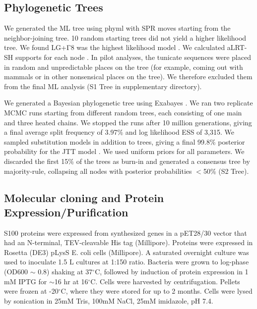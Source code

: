 \subsection{Phylogenetic Trees}

We generated the ML tree using phyml \cite{guindon_new_2010} with
SPR moves starting from the neighbor-joining tree. 10 random starting
trees did not yield a higher likelihood tree. We found LG+Γ8 was
the highest likelihood model \cite{le_improved_2008}. We calculated
aLRT-SH supports for each node \cite{anisimova_survey_2011}. In pilot
analyses, the tunicate sequences were placed in random and unpredictable
places on the tree (for example, coming out with mammals or in other
nonsensical places on the tree). We therefore excluded them from the
final ML analysis (S1 Tree in supplementary directory).

We generated a Bayesian phylogenetic tree using Exabayes \cite{aberer_exabayes:_2014}.
We ran two replicate MCMC runs starting from different random trees,
each consisting of one main and three heated chains. We stopped the
runs after 10 million generations, giving a final average split frequency
of 3.97\% and log likelihood ESS of 3,315. We sampled substitution
models in addition to trees, giving a final 99.8\% posterior probability
for the JTT model \cite{jones_rapid_1992}. We used uniform priors
for all parameters. We discarded the first 15\% of the trees as burn-in
and generated a consensus tree by majority-rule, collapsing all nodes
with posterior probabilities $<$50\% (S2 Tree).

\subsection{Molecular cloning and Protein Expression/Purification}

S100 proteins were expressed from synthesized genes in a pET28/30
vector that had an N-terminal, TEV-cleavable His tag (Millipore).
Proteins were expressed in Rosetta (DE3) pLysS E. coli cells (Millipore).
A saturated overnight culture was used to inoculate 1.5 L cultures
at 1:150 ratio. Bacteria were grown to log-phase (OD600 $\sim$ 0.8)
shaking at 37$^{\circ}$C, followed by induction of protein expression
in 1 mM IPTG for $\sim$16 hr at 16$^{\circ}$C. Cells were harvested
by centrifugation. Pellets were frozen at -20$^{\circ}$C, where they
were stored for up to 2 months. Cells were lysed by sonication in
25mM Tris, 100mM NaCl, 25mM imidazole, pH 7.4.

